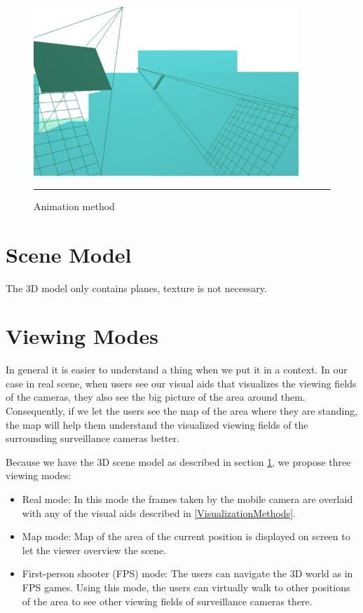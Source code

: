 \begin{figure}[htbp]
	\centering
	\includegraphics[width=10cm]{./Primitives/theory_animation.png}
	\rule{35em}{0.5pt}
	\caption[Animation method]{Animation method}
	\label{fig:AnimationMethod}
\end{figure}

\section{Scene Model}
\label{SceneModel}

The 3D model only contains planes, texture is not necessary.


\section{Viewing Modes}

In general it is easier to understand a thing when we put it in a context. In our case in real scene, when users see our visual aids that visualizes the viewing fields of the cameras, they also see the big picture of the area around them. Consequently, if we let the users see the map of the area where they are standing, the map will help them understand the visualized viewing fields of the surrounding surveillance cameras better.

Because we have the 3D scene model as described in section \ref{SceneModel}, we propose three viewing modes:

\begin{itemize}
	\item Real mode: In this mode the frames taken by the mobile camera are overlaid with any of the visual aids described in \ref{VisualizationMethods}.
	\item Map mode: Map of the area of the current position is displayed on screen to let the viewer overview the scene.
	\item First-person shooter (FPS) mode: The users can navigate the 3D world as in FPS games. Using this mode, the users can virtually walk to other positions of the area to see other viewing fields of surveillance cameras there.
\end{itemize}

